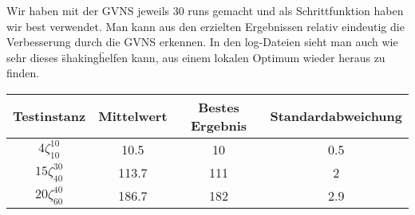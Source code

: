 \documentclass[a4paper,10pt]{article}
\begin{document}
Wir haben mit der GVNS jeweils 30 runs gemacht und als Schrittfunktion haben wir best verwendet. Man kann aus den erzielten Ergebnissen relativ eindeutig die Verbesserung durch die GVNS erkennen. In den log-Dateien sieht man auch wie sehr dieses \"shaking\" helfen kann, aus einem lokalen Optimum wieder heraus zu finden.
\bigskip

\begin{tabular}{cccc}
\hline
Testinstanz & Mittelwert & Bestes Ergebnis & Standardabweichung \\
\hline
$4\zeta_{10}^{10}$ & 10.5 & 10 & 0.5 \\									
$15\zeta_{40}^{30}$ & 113.7 & 111 & 2 \\									
$20\zeta_{60}^{40}$ & 186.7 & 182 & 2.9 \\						
\hline
\end{tabular}
\end{document}
